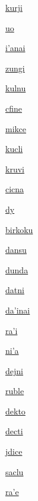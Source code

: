 {\hyperlink{val:kurji}{kurji}}{}{}{}

{\hyperlink{val:uo}{uo}}{}{}{}

{\hyperlink{val:ihanai}{i'anai}}{}{}{}

{\hyperlink{val:zungi}{zungi}}{}{}{}

{\hyperlink{val:kulnu}{kulnu}}{}{}{}

{\hyperlink{val:cfine}{cfine}}{}{}{}

{\hyperlink{val:mikce}{mikce}}{}{}{}

{\hyperlink{val:kucli}{kucli}}{}{}{}

{\hyperlink{val:kruvi}{kruvi}}{}{}{}

{\hyperlink{val:cicna}{cicna}}{}{}{}

{\hyperlink{val:dy}{dy}}{}{}{}

{\hyperlink{val:birkoku}{birkoku}}{}{}{}

{\hyperlink{val:dansu}{dansu}}{}{}{}

{\hyperlink{val:dunda}{dunda}}{}{}{}

{\hyperlink{val:datni}{datni}}{}{}{}

{\hyperlink{val:dahinai}{da'inai}}{}{}{}

{\hyperlink{val:rahi}{ra'i}}{}{}{}

{\hyperlink{val:niha}{ni'a}}{}{}{}

{\hyperlink{val:dejni}{dejni}}{}{}{}

{\hyperlink{val:ruble}{ruble}}{}{}{}

{\hyperlink{val:dekto}{dekto}}{}{}{}

{\hyperlink{val:decti}{decti}}{}{}{}

{\hyperlink{val:jdice}{jdice}}{}{}{}

{\hyperlink{val:saclu}{saclu}}{}{}{}

{\hyperlink{val:rahe}{ra'e}}{}{}{}

